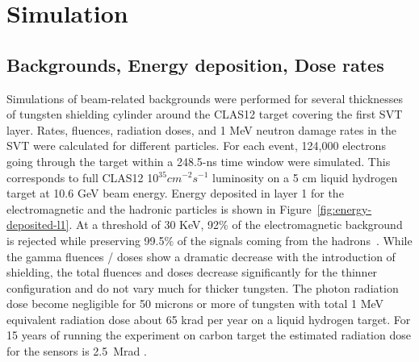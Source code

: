 \section{Simulation}



\subsection{Backgrounds, Energy deposition, Dose rates}
Simulations of beam-related backgrounds were performed for several thicknesses of tungsten shielding cylinder around the CLAS12 target covering the first SVT layer. Rates, fluences, radiation doses, and 1 MeV neutron damage rates in the SVT were calculated for different particles. For each event, 124,000 electrons going through the target within a 248.5-ns time window were simulated. This corresponds to full CLAS12 10$^{35} cm^{-2}s^{-1}$ luminosity on a 5 cm liquid hydrogen target at 10.6 GeV beam energy. 
Energy deposited in layer 1 for the electromagnetic and the hadronic particles is shown in Figure~\ref{fig:energy-deposited-l1}. At a threshold of 30 KeV, 92$\%$ of the electromagnetic background is rejected while preserving  99.5$\%$ of the signals coming from the hadrons~\cite{TDRSVT}.
While the gamma fluences / doses show a dramatic decrease with the introduction of shielding, the total fluences and doses decrease significantly for the thinner configuration and do not vary much for thicker tungsten. The photon radiation dose become negligible for 50 microns or more of tungsten with total 1 MeV equivalent radiation dose about 65 krad per year on a liquid hydrogen target. For 15 years of running the experiment on carbon target the estimated radiation dose for the sensors is 2.5~Mrad \cite{TDRSVT}. 


